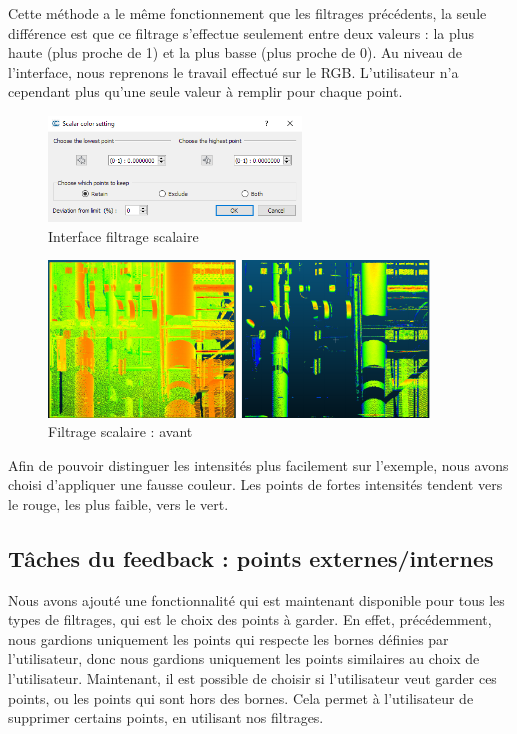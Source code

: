 \documentclass[12pt,titlepage,french]{article}
\begin{document}
Cette méthode a le même fonctionnement que les filtrages précédents, la seule différence est que ce filtrage s'effectue seulement entre deux valeurs : la plus haute (plus proche de 1) et la plus basse (plus proche de 0). Au niveau de l'interface, nous reprenons le travail effectué sur le RGB. L'utilisateur n'a cependant plus qu'une seule valeur à remplir pour chaque point. \newline

\begin{figure}[H]
\center \includegraphics[width=0.6\textwidth]{./img/scalar_menu.png}
  \caption{\label{} Interface filtrage scalaire}
\end{figure}

\begin{figure}[H]
\center
\includegraphics[width=0.9\textwidth]{./img/scalaire_avant_apres.png}
\caption{\label{} Filtrage scalaire : avant}
\end{figure}

Afin de pouvoir distinguer les intensités plus facilement sur l'exemple, nous avons choisi d'appliquer une fausse couleur. Les points de fortes intensités tendent vers le rouge, les plus faible, vers le vert.

\subsection{Tâches du feedback : points externes/internes}

Nous avons ajouté une fonctionnalité qui est maintenant disponible pour tous les types de filtrages, qui est le choix des points à garder. En effet, précédemment, nous gardions uniquement les points qui respecte les bornes définies par l'utilisateur, donc nous gardions uniquement les points similaires au choix de l'utilisateur. Maintenant, il est possible de choisir si l'utilisateur veut garder ces points, ou les points qui sont hors des bornes. Cela permet à l'utilisateur de supprimer certains points, en utilisant nos filtrages. \newline
\end{document}
